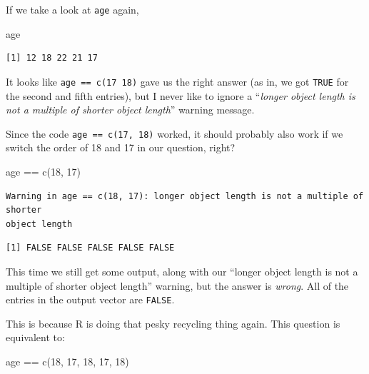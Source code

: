 \documentclass[
  letterpaper,
  DIV=11,
  numbers=noendperiod]{scrreprt}
\newenvironment{Shaded}{\begin{snugshade}}{\end{snugshade}}
\newcommand{\DecValTok}[1]{\textcolor[rgb]{0.68,0.00,0.00}{#1}}
\newcommand{\FunctionTok}[1]{\textcolor[rgb]{0.28,0.35,0.67}{#1}}
\newcommand{\NormalTok}[1]{\textcolor[rgb]{0.00,0.23,0.31}{#1}}
\newcommand{\SpecialCharTok}[1]{\textcolor[rgb]{0.37,0.37,0.37}{#1}}
\begin{document}
If we take a look at \texttt{age} again,

\begin{Shaded}
\begin{Highlighting}[]
\NormalTok{age}
\end{Highlighting}
\end{Shaded}

\begin{verbatim}
[1] 12 18 22 21 17
\end{verbatim}

It looks like \texttt{age\ ==\ c(17\ 18)} gave us the right answer (as
in, we got \texttt{TRUE} for the second and fifth entries), but I never
like to ignore a ``\emph{longer object length is not a multiple of
shorter object length}'' warning message.

Since the code \texttt{age\ ==\ c(17,\ 18)} worked, it should probably
also work if we switch the order of 18 and 17 in our question, right?

\begin{Shaded}
\begin{Highlighting}[]
\NormalTok{age }\SpecialCharTok{==} \FunctionTok{c}\NormalTok{(}\DecValTok{18}\NormalTok{, }\DecValTok{17}\NormalTok{)}
\end{Highlighting}
\end{Shaded}

\begin{verbatim}
Warning in age == c(18, 17): longer object length is not a multiple of shorter
object length
\end{verbatim}

\begin{verbatim}
[1] FALSE FALSE FALSE FALSE FALSE
\end{verbatim}

This time we still get some output, along with our ``longer object
length is not a multiple of shorter object length'' warning, but the
answer is \emph{wrong}. All of the entries in the output vector are
\texttt{FALSE}.

This is because R is doing that pesky recycling thing again. This
question is equivalent to:

\begin{Shaded}
\begin{Highlighting}[]
\NormalTok{age }\SpecialCharTok{==} \FunctionTok{c}\NormalTok{(}\DecValTok{18}\NormalTok{, }\DecValTok{17}\NormalTok{, }\DecValTok{18}\NormalTok{, }\DecValTok{17}\NormalTok{, }\DecValTok{18}\NormalTok{)}
\end{Highlighting}
\end{Shaded}
\end{document}
